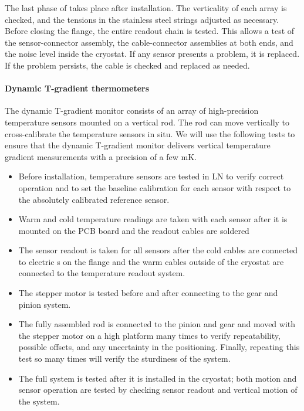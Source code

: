 The last phase of  takes place after installation. %
The verticality of each array %
is checked, and the tensions in the stainless steel strings adjusted as necessary.
Before closing the flange, the entire readout chain is %
tested.  
This allows a test of the sensor-connector assembly, the cable-connector assemblies at both ends, and the noise level inside the cryostat.
If any sensor presents a problem, it is replaced. If the problem persists, the cable is checked and replaced as needed.

\paragraph{Dynamic T-gradient thermometers}
\label{sec:fdgen-slow-cryo-qc-thdy}

The dynamic T-gradient monitor consists of an array of high-precision temperature sensors mounted on a vertical rod. The rod can move vertically to cross-calibrate the temperature sensors in situ. %
We will use the following %
tests to ensure that the dynamic T-gradient monitor delivers vertical temperature gradient measurements with a precision of a few \si{mK}.

\begin{itemize}
\item
Before installation, temperature sensors are tested in LN to verify correct operation and to set the baseline calibration for each sensor with respect to the absolutely calibrated reference sensor. 
\item
Warm and cold temperature readings are taken with each sensor after it is mounted on the PCB board and the readout cables are soldered %
\item
The sensor readout is taken for all sensors after the cold cables are connected to electric \fdth{}s on the flange and the warm cables outside of the cryostat are connected to the temperature readout system.
\item 
The stepper motor is tested before and after connecting to the gear and pinion system.
\item
The fully assembled rod is connected to the pinion and gear and moved with the stepper motor on a high platform many times to verify repeatability, possible offsets, and any uncertainty in the positioning. Finally, repeating this test so many times will verify the sturdiness of the system.
\item
The full system is tested after it is installed in the cryostat; both motion and sensor operation are tested by checking %
sensor readout and vertical motion of the system.
\end{itemize} 

